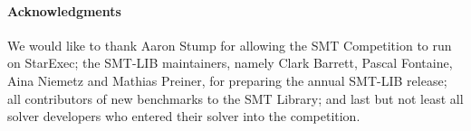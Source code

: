 \documentclass[twoside,11pt]{article}
\begin{document}
\paragraph{Acknowledgments}

We would like to thank Aaron Stump for allowing the SMT Competition to
run on StarExec; the SMT-LIB maintainers, namely Clark Barrett, Pascal
Fontaine, Aina Niemetz and Mathias Preiner, for preparing the annual
SMT-LIB release; all contributors of new benchmarks to the SMT
Library; and last but not least all solver developers who entered
their solver into the competition.




\end{document}
